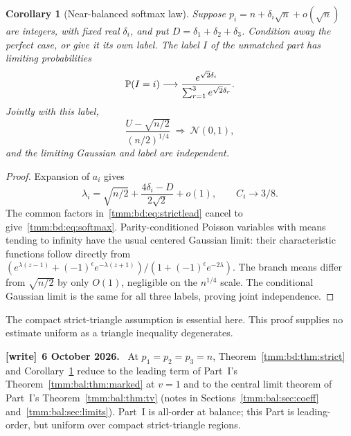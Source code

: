 \documentclass[11pt,letterpaper]{article}
\newtheorem{corollary}[theorem]{Corollary}
\theoremstyle{remark}\newtheorem{remark}[theorem]{Remark}
\newcommand{\Normal}{\mathcal N}
\newenvironment{writenote}[1][]{\par\smallskip\begingroup\small
 \noindent\textbf{[write]}\if\relax\detokenize{#1}\relax\else~\textbf{#1.}\fi\ }%
 {\par\endgroup\smallskip}
\begin{document}
\begin{corollary}[Near-balanced softmax law]\label{tmm:bd:cor:softmax}
Suppose $p_i=n+\delta_i\sqrt n+o(\sqrt n)$ are integers, with fixed real $\delta_i$, and put $D=\delta_1+\delta_2+\delta_3$. Condition away the perfect case, or give it its own label. The label $I$ of the unmatched part has limiting probabilities
\begin{equation}\label{tmm:bd:eq:softmax}
 \mathbb P(I=i)\longrightarrow
 \frac{e^{\sqrt2\delta_i}}{\sum_{r=1}^3e^{\sqrt2\delta_r}}.
\end{equation}
Jointly with this label,
\[
 \frac{U-\sqrt{n/2}}{(n/2)^{1/4}}\ \Longrightarrow\ \Normal(0,1),
\]
and the limiting Gaussian and label are independent.
\end{corollary}
\begin{proof}
Expansion of $a_i$ gives
\[
 \lambda_i=\sqrt{n/2}+\frac{4\delta_i-D}{2\sqrt2}+o(1),
 \qquad C_i\longrightarrow3/8.
\]
The common factors in~\eqref{tmm:bd:eq:strictlead} cancel to give~\eqref{tmm:bd:eq:softmax}. Parity-conditioned Poisson variables with means tending to infinity have the usual centered Gaussian limit: their characteristic functions follow directly from $(e^{\lambda(z-1)}+(-1)^\epsilon e^{-\lambda(z+1)})/(1+(-1)^\epsilon e^{-2\lambda})$. The branch means differ from $\sqrt{n/2}$ by only $O(1)$, negligible on the $n^{1/4}$ scale. The conditional Gaussian limit is the same for all three labels, proving joint independence.
\end{proof}
The compact strict-triangle assumption is essential here. This proof supplies no estimate uniform as a triangle inequality degenerates.
\begin{writenote}[6 October 2026]
At $p_1=p_2=p_3=n$, Theorem~\ref{tmm:bd:thm:strict} and Corollary~\ref{tmm:bd:cor:softmax} reduce to the leading term of Part~I's Theorem~\ref{tmm:bal:thm:marked} at $v=1$ and to the central limit theorem of Part~I's Theorem~\ref{tmm:bal:thm:tv} (notes in Sections~\ref{tmm:bal:sec:coeff} and~\ref{tmm:bal:sec:limits}). Part~I is all-order at balance; this Part is leading-order, but uniform over compact strict-triangle regions.
\end{writenote}
\end{document}
